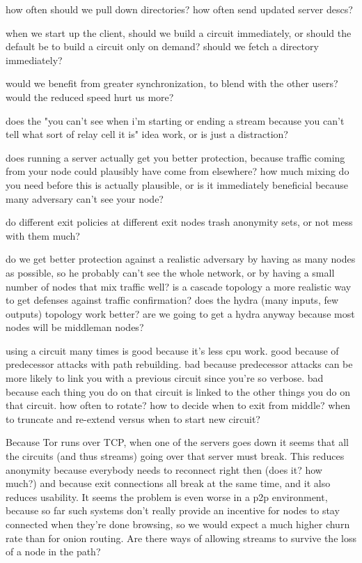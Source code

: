 \documentclass[times,10pt,twocolumn]{article}
\begin{document}
how often should we pull down directories? how often send updated
server descs?

when we start up the client, should we build a circuit immediately,
or should the default be to build a circuit only on demand? should we
fetch a directory immediately?

would we benefit from greater synchronization, to blend with the other
users? would the reduced speed hurt us more?

does the "you can't see when i'm starting or ending a stream because
you can't tell what sort of relay cell it is" idea work, or is just
a distraction?

does running a server actually get you better protection, because traffic
coming from your node could plausibly have come from elsewhere? how
much mixing do you need before this is actually plausible, or is it
immediately beneficial because many adversary can't see your node?

do different exit policies at different exit nodes trash anonymity sets,
or not mess with them much?

do we get better protection against a realistic adversary by having as
many nodes as possible, so he probably can't see the whole network,
or by having a small number of nodes that mix traffic well? is a
cascade topology a more realistic way to get defenses against traffic
confirmation? does the hydra (many inputs, few outputs) topology work
better? are we going to get a hydra anyway because most nodes will be
middleman nodes?

using a circuit many times is good because it's less cpu work.
  good because of predecessor attacks with path rebuilding.
  bad because predecessor attacks can be more likely to link you with a
    previous circuit since you're so verbose.
  bad because each thing you do on that circuit is linked to the other
    things you do on that circuit.
  how often to rotate?
  how to decide when to exit from middle?
  when to truncate and re-extend versus when to start new circuit?

Because Tor runs over TCP, when one of the servers goes down it seems
that all the circuits (and thus streams) going over that server must
break. This reduces anonymity because everybody needs to reconnect
right then (does it? how much?) and because exit connections all break
at the same time, and it also reduces usability. It seems the problem
is even worse in a p2p environment, because so far such systems don't
really provide an incentive for nodes to stay connected when they're
done browsing, so we would expect a much higher churn rate than for
onion routing. Are there ways of allowing streams to survive the loss
of a node in the path?
\end{document}
